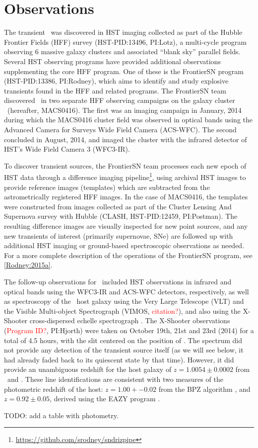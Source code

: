 \section{Observations}\label{sec:Observations}

The transient \spock\ was discovered in HST imaging collected as part
of the Hubble Frontier Fields (HFF) survey (HST-PID:13496, PI:Lotz), a
multi-cycle program observing 6 massive galaxy clusters and associated
``blank sky'' parallel fields.  Several HST observing programs have
provided additional observations supplementing the core HFF program.
One of these is the FrontierSN program (HST-PID:13386, PI:Rodney),
which aims to identify and study explosive transients found in the HFF
and related programs.  The FrontierSN team discovered \spock\ in two
separate HFF observing campaigns on the galaxy cluster
\ (hereafter, MACS0416).  The first was an imaging campaign
in January, 2014 during which the MACS0416 cluster field was observed
in optical bands using the Advanced Camera for Surveys Wide Field
Camera (ACS-WFC).  The second concluded in August, 2014, and imaged
the cluster with the infrared detector of HST's Wide Field Camera 3
(WFC3-IR).

To discover transient sources, the FrontierSN team processes each new
epoch of HST data through a difference imaging
pipeline\footnote{\url{https://github.com/srodney/sndrizpipe}}, using
archival HST images to provide reference images (templates) which are
subtracted from the astrometrically registered HFF images. In the case
of MACS0416, the templates were constructed from images collected as
part of the Cluster Lensing And Supernova survey with Hubble (CLASH,
HST-PID:12459, PI:Postman). The resulting difference images are
visually inspected for new point sources, and any new transients of
interest (primarily supernovae, SNe) are followed up with additional
HST imaging or ground-based spectroscopic observations as needed.  For
a more complete description of the operations of the FrontierSN
program, see \ref{Rodney:2015a}.

The follow-up observations for \spock\ included HST observations in
infrared and optical bands using the WFC3-IR and ACS-WFC detectors,
respectively, as well as spectroscopy of the \spock\ host galaxy using
the Very Large Telescope (VLT) and the Visible Multi-object
Spectrograph (VIMOS, \textcolor{red}{citation?}), and also using the
X-Shooter cross-dispersed echelle spectrograph
\citep{Vernet:2011}. The X-Shooter observations
(\textcolor{red}{Program ID?}, PI:Hjorth) were taken on October 19th,
21st and 23rd (2014) for a total of 4.5 hours, with the slit centered
on the position of .  The spectrum did not provide any
detection of the transient source itself (as we will see below, it had
already faded back to its quiescent state by that time).  However, it
did provide an unambiguous redshift for the host galaxy of
$z=1.0054\pm0.0002$ from \Ha\ and .  These line
identifications are consistent with two measures of the photometric
redshift of the host: $z=1.00+-0.02$ from the BPZ algorithm
\citep{Benitez:2000}, and $z=0.92\pm0.05$, derived using the EAZY
program \citep{Brammer:2008}.


TODO: add a table with photometry.


  
  

  
  
  